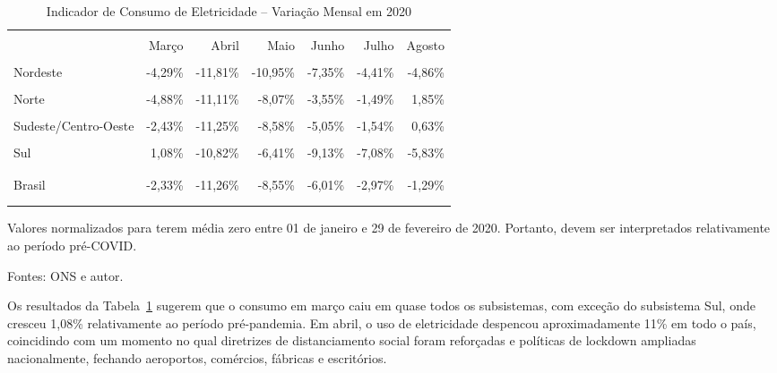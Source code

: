 \documentclass[12pt]{article}
\begin{document}
\begin{table}[!htp]
	\centering
	\caption{Indicador de Consumo de Eletricidade -- Variação Mensal em 2020}
	\label{tab:table1}
	\begin{threeparttable}[!hp]
		\begin{tabular}{lrrrrrr}
			\\[-0.75em] \toprule \\[-1em]
			{} &  Março &  Abril &  Maio &  Junho &  Julho &  Agosto \\
			\midrule \\[-1em]
			Nordeste             &       -4,29\% &      -11,81\% &      -10,95\% &       -7,35\% &       -4,41\% &       -4,86\% \\ \\[-1em]
			Norte                 &       -4,88\% &      -11,11\% &       -8,07\% &       -3,55\% &       -1,49\% &        1,85\% \\ \\[-1em]
			Sudeste/Centro-Oeste &       -2,43\% &      -11,25\% &       -8,58\% &       -5,05\% &       -1,54\% &        0,63\% \\ \\[-1em]
			Sul                 &        1,08\% &      -10,82\% &       -6,41\% &       -9,13\% &       -7,08\% &       -5,83\% \\ \\[-1em] \hdashline[2pt/3pt] \\[-0.75em]
			Brasil                &       -2,33\% &      -11,26\% &       -8,55\% &       -6,01\% &       -2,97\% &       -1,29\% \\ \\[-1em]
			\bottomrule \\[-0.75em]
		\end{tabular}
		\begin{tablenotes}
			\item[1] \small Valores normalizados para terem média zero entre 01 de janeiro e 29 de fevereiro de 2020. Portanto, devem ser interpretados relativamente ao período pré-COVID.
			\item[2] \small Fontes: ONS e autor.
		\end{tablenotes}
	\end{threeparttable}
\end{table} 

Os resultados da Tabela~{\ref{tab:table1}} sugerem que o consumo em março caiu em quase todos os subsistemas, com exceção do subsistema Sul, onde cresceu 1,08\% relativamente ao período pré-pandemia. Em abril, o uso de eletricidade despencou aproximadamente 11\% em todo o país, coincidindo com um momento no qual diretrizes de distanciamento social foram reforçadas e políticas de lockdown ampliadas nacionalmente, fechando aeroportos, comércios, fábricas e escritórios. 
\end{document}
